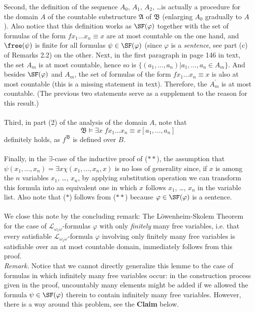 \begin{enumerate}[1.]
Second, the definition of the sequence $A_0$, $A_1$, $A_2$, \ldots is actually a procedure for the domain $A$ of the countable substructure $\mathfrak{A}$ of $\mathfrak{B}$ (enlarging $A_0$ gradually to $A$). Also notice that this definition works as $\SF(\varphi)$ together with the set of formulas of the form $fx_1 \ldots x_n \equiv x$ are at most countable on the one hand, and $\free(\psi)$ is finite for all formulas $\psi \in \SF(\varphi)$ (since $\varphi$ is a \emph{sentence}, see part (c) of Remarks 2.2) on the other. Next, in the first paragraph in page 146 in text, the set $A_m$ is at most countable, hence so is $\{ (a_1, \ldots, a_n) | a_1, \ldots, a_n \in A_m \}$. And besides $\SF(\varphi)$ and $A_m$, the set of formulas of the form $fx_1 \ldots x_n \equiv x$ is also at most countable (this is a missing statement in text). Therefore, the $A_m^\prime$ is at most countable. (The previous two statements serve as a supplement to the reason for this result.)\\
\\
Third, in part (2) of the analysis of the domain $A$, note that
\[
\mathfrak{B} \models \exists x \; fx_1 \ldots x_n \equiv x[a_1, \ldots, a_n]
\]
definitely holds, as $f^\mathfrak{B}$ is defined over $B$.\\
\\
Finally, in the $\exists$-case of the inductive proof of ($\ast\ast$), the assumption that $\psi(x_1, \ldots, x_n) = \exists x \chi(x_1, \ldots, x_n, x)$ is no loss of generality since, if $x$ is among the $n$ variables $x_1$, \ldots, $x_n$, by applying substitution operation we can transform this formula into an equivalent one in which $x$ follows $x_1$, \ldots, $x_n$ in the variable list. Also note that ($\ast$) follows from ($\ast\ast$) because $\varphi \in \SF(\varphi)$ is a sentence.\\
\\
We close this note by the concluding remark: The L\"{o}wenheim-Skolem Theorem for the case of $\mathcal{L}_{\omega_1\omega}$-formulas $\varphi$ with only \emph{finitely} many free variables, i.e. that every satisfiable $\mathcal{L}_{\omega_1\omega}$-formula $\varphi$ involving only finitely many free variables is satisfiable over an at most countable domain, immediately follows from this proof.\newline
\ 
\\\textit{Remark.} Notice that we cannot directly generalize this lemme to the case of formulas in which infinitely many free variables occur: in the construction process given in the proof, uncountably many elements might be added if we allowed the formula $\psi \in \SF (\varphi)$ therein to contain infinitely many free variables. However, there is a way around this problem, see the \textbf{Claim} below.

\end{enumerate}
